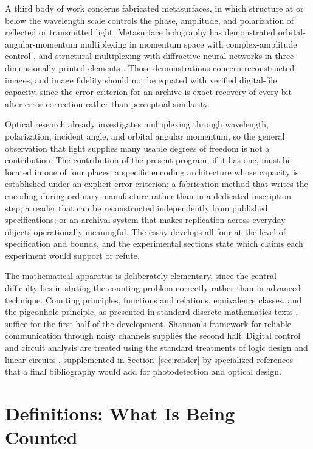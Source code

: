 A third body of work concerns fabricated metasurfaces, in which structure at or below the wavelength scale controls the phase, amplitude, and polarization of reflected or transmitted light. Metasurface holography has demonstrated orbital-angular-momentum multiplexing in momentum space with complex-amplitude control \cite{ren2020}, and structural multiplexing with diffractive neural networks in three-dimensionally printed elements \cite{fan2024}. Those demonstrations concern reconstructed images, and image fidelity should not be equated with verified digital-file capacity, since the error criterion for an archive is exact recovery of every bit after error correction rather than perceptual similarity.

Optical research already investigates multiplexing through wavelength, polarization, incident angle, and orbital angular momentum, so the general observation that light supplies many usable degrees of freedom is not a contribution. The contribution of the present program, if it has one, must be located in one of four places: a specific encoding architecture whose capacity is established under an explicit error criterion; a fabrication method that writes the encoding during ordinary manufacture rather than in a dedicated inscription step; a reader that can be reconstructed independently from published specifications; or an archival system that makes replication across everyday objects operationally meaningful. The essay develops all four at the level of specification and bounds, and the experimental sections state which claims each experiment would support or refute.

The mathematical apparatus is deliberately elementary, since the central difficulty lies in stating the counting problem correctly rather than in advanced technique. Counting principles, functions and relations, equivalence classes, and the pigeonhole principle, as presented in standard discrete mathematics texts \cite{epp,kolman}, suffice for the first half of the development. Shannon's framework for reliable communication through noisy channels \cite{shannon1948,cover2006} supplies the second half. Digital control and circuit analysis are treated using the standard treatments of logic design \cite{mano} and linear circuits \cite{boylestad}, supplemented in Section~\ref{sec:reader} by specialized references that a final bibliography would add for photodetection and optical design.

\section{Definitions: What Is Being Counted}\label{sec:defs}

